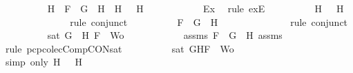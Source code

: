 \begin{isabellebody}
\ \ \ \ \ \ \ \ \isamarkupfalse%
\ H{}\ \ {}{\isacharcolon}{\isachardoublequoteopen}F\ {\isacharequal}\ \isactrlbold {\isasymnot}{\isacharparenleft}G\ \isactrlbold {\isasymrightarrow}\ H{}{\isacharparenright}\ {\isasymand}\ H\ {\isacharequal}\ \isactrlbold {\isasymnot}\ H{}{\isachardoublequoteclose}\isanewline
\ \ \ \ \ \ \ \ \ \ \isamarkupfalse%
\ Ex{}\ \isamarkupfalse%
\ {\isacharparenleft}rule\ exE{\isacharparenright}\isanewline
\ \ \ \ \ \ \ \ \isamarkupfalse%
\ {\isachardoublequoteopen}H\ {\isacharequal}\ \isactrlbold {\isasymnot}\ H{}{\isachardoublequoteclose}\isanewline
\ \ \ \ \ \ \ \ \ \ \isamarkupfalse%
\ {}\ \isamarkupfalse%
\ {\isacharparenleft}rule\ conjunct{}{\isacharparenright}\isanewline
\ \ \ \ \ \ \ \ \isamarkupfalse%
\ {\isachardoublequoteopen}F\ {\isacharequal}\ \isactrlbold {\isasymnot}{\isacharparenleft}G\ \isactrlbold {\isasymrightarrow}\ H{}{\isacharparenright}{\isachardoublequoteclose}\isanewline
\ \ \ \ \ \ \ \ \ \ \isamarkupfalse%
\ {}\ \isamarkupfalse%
\ {\isacharparenleft}rule\ conjunct{}{\isacharparenright}\isanewline
\ \ \ \ \ \ \ \ \isamarkupfalse%
\ {\isachardoublequoteopen}sat\ {\isacharparenleft}{\isacharbraceleft}G{\isacharcomma}\ \isactrlbold {\isasymnot}\ H{}{\isacharcomma}\ F{\isacharbraceright}\ {\isasymunion}\ Wo{\isacharparenright}{\isachardoublequoteclose}\isanewline
\ \ \ \ \ \ \ \ \ \ \isamarkupfalse%
\ assms{\isacharparenleft}{}{\isacharparenright}\ {\isacartoucheopen}F\ {\isacharequal}\ \isactrlbold {\isasymnot}{\isacharparenleft}G\ \isactrlbold {\isasymrightarrow}\ H{}{\isacharparenright}{\isacartoucheclose}\ assms{\isacharparenleft}{}{\isacharcomma}{}{\isacharcomma}{}{\isacharparenright}\ \isamarkupfalse%
\ {\isacharparenleft}rule\ pcp{\isacharunderscore}colecComp{\isacharunderscore}CON{\isacharunderscore}sat{}{\isacharparenright}\isanewline
\ \ \ \ \ \ \ \ \isamarkupfalse%
\ {\isachardoublequoteopen}sat\ {\isacharparenleft}{\isacharbraceleft}G{\isacharcomma}H{\isacharcomma}F{\isacharbraceright}\ {\isasymunion}\ Wo{\isacharparenright}{\isachardoublequoteclose}\isanewline
\ \ \ \ \ \ \ \ \ \ \isamarkupfalse%
\ {\isacharparenleft}simp\ only{\isacharcolon}\ {\isacartoucheopen}H\ {\isacharequal}\ \isactrlbold {\isasymnot}\ H{}{\isacartoucheclose}{\isacharparenright}\isanewline

\end{isabellebody}

